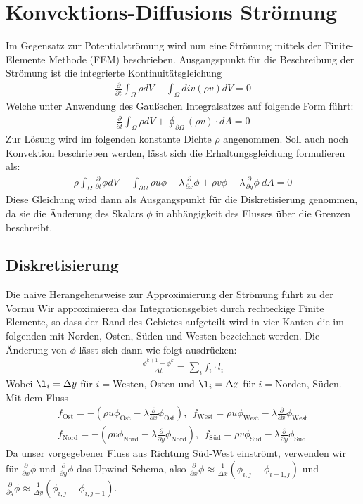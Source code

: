 \documentclass{article}
\newcommand{\ddt}{\frac{\partial }{\partial t}}
\newcommand{\ddx}{\frac{\partial }{\partial x}}
\newcommand{\ddy}{\frac{\partial }{\partial y}}
\begin{document}
\section{Konvektions-Diffusions Strömung}
Im Gegensatz zur Potentialströmung wird nun eine Strömung mittels der Finite-Elemente Methode (FEM) beschrieben. Ausgangspunkt
für die Beschreibung der Strömung ist die integrierte Kontinuitätsgleichung
\begin{align}
\ddt \int_{\Omega} \rho dV + \int_{\Omega} div(\rho v) dV = 0
\end{align}
Welche unter Anwendung des Gaußschen Integralsatzes auf folgende Form führt:
\begin{align}
\ddt \int_{\Omega} \rho dV + \oint_{\partial \Omega} (\rho v)\cdot dA = 0
\end{align}	
Zur Lösung wird im folgenden konstante Dichte $\rho$ angenommen. 
Soll auch noch Konvektion beschrieben werden, lässt sich die Erhaltungsgleichung formulieren als:
\begin{align}
\rho \int_{\Omega}\ddt \phi dV + \int_{\partial \Omega}\rho u \phi -\lambda \ddx \phi + \rho v \phi - \lambda \ddy \phi \ dA =0 
\end{align}
Diese Gleichung wird dann als Ausgangspunkt für die Diskretisierung genommen, 
da sie die Änderung des Skalars $\phi$ in abhängigkeit des Flusses über die Grenzen beschreibt.

\subsection{Diskretisierung}
Die naive Herangehensweise zur Approximierung der Strömung führt zu der Vormu
Wir approximieren das Integrationsgebiet durch rechteckige Finite Elemente, so dass der Rand des Gebietes aufgeteilt wird in vier Kanten
die im folgenden mit Norden, Osten, Süden und Westen bezeichnet werden. 
Die Änderung von $\phi$ lässt sich dann wie folgt ausdrücken:
\begin{align}
\frac{\phi^{k+1}-\phi^k}{\Delta t} = \sum_{i} f_i\cdot l_i
\end{align}
Wobei $\l_i = \Delta y$ für $i=$Westen, Osten und $\l_i = \Delta x$ für $i=$Norden, Süden.
Mit dem Fluss
\begin{align}
f_{\text{Ost}} = -(\rho u \phi_{\text{Ost}}- \lambda \ddx \phi_{\text{Ost}}), \ \ 
f_{\text{West}} = \rho u \phi_{\text{West}}- \lambda \ddx \phi_{\text{West}} \\
f_{\text{Nord}} = -(\rho v \phi_{\text{Nord}}- \lambda \ddy \phi_{\text{Nord}}),\ \ 
f_{\text{Süd}} = \rho v \phi_{\text{Süd}}- \lambda \ddy \phi_{\text{Süd}}
\end{align} 
Da unser vorgegebener Fluss aus Richtung Süd-West einströmt, verwenden wir für $\ddx \phi$ und $\ddy \phi$ das Upwind-Schema,
also $\ddx \phi \approx \frac{1}{\Delta x}(\phi_{i,j}-\phi_{i-1,j})$ und  $\ddy \phi \approx \frac{1}{\Delta y}(\phi_{i,j}-\phi_{i,j-1})$.
 
\end{document}
